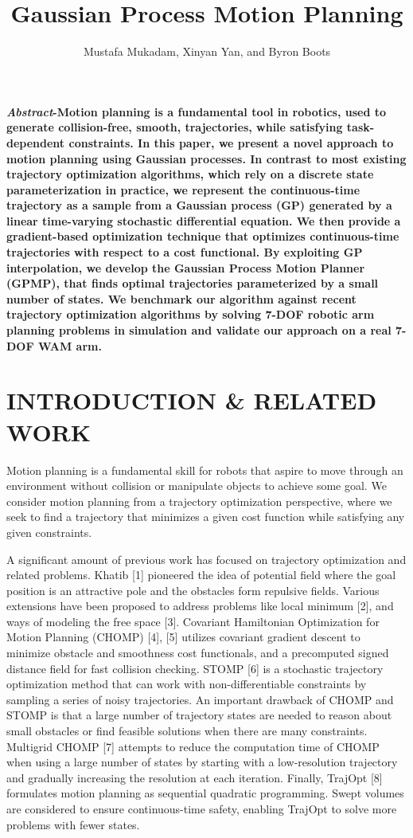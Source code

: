 \documentclass{IEEEtran}
\title{Gaussian Process Motion Planning}
\author{Mustafa Mukadam, Xinyan Yan, and Byron Boots}
\date{}
\begin{document}
\maketitle
\textbf{\emph{Abstract}-Motion planning is a fundamental tool in robotics,
used to generate collision-free, smooth, trajectories, while satisfying task-dependent constraints. In this paper, we present a
novel approach to motion planning using Gaussian processes.
In contrast to most existing trajectory optimization algorithms,
which rely on a discrete state parameterization in practice,
we represent the continuous-time trajectory as a sample from
a Gaussian process (GP) generated by a linear time-varying
stochastic differential equation. We then provide a gradient-based optimization technique that optimizes continuous-time
trajectories with respect to a cost functional. By exploiting GP
interpolation, we develop the Gaussian Process Motion Planner
(GPMP), that finds optimal trajectories parameterized by a
small number of states. We benchmark our algorithm against
recent trajectory optimization algorithms by solving 7-DOF
robotic arm planning problems in simulation and validate our
approach on a real 7-DOF WAM arm.}
\section{INTRODUCTION \& RELATED WORK}
Motion planning is a fundamental skill for robots that
aspire to move through an environment without collision
or manipulate objects to achieve some goal. We consider
motion planning from a trajectory optimization perspective,
where we seek to find a trajectory that minimizes a given
cost function while satisfying any given constraints.

A significant amount of previous work has focused on
trajectory optimization and related problems. Khatib [1]
pioneered the idea of potential field where the goal position is
an attractive pole and the obstacles form repulsive fields. Various extensions have been proposed to address problems like
local minimum [2], and ways of modeling the free space [3].
Covariant Hamiltonian Optimization for Motion Planning
(CHOMP) [4], [5] utilizes covariant gradient descent to minimize obstacle and smoothness cost functionals, and a precomputed signed distance field for fast collision checking.
STOMP [6] is a stochastic trajectory optimization method
that can work with non-differentiable constraints by sampling
a series of noisy trajectories. An important drawback of
CHOMP and STOMP is that a large number of trajectory
states are needed to reason about small obstacles or find
feasible solutions when there are many constraints. Multigrid
CHOMP [7] attempts to reduce the computation time of
CHOMP when using a large number of states by starting
with a low-resolution trajectory and gradually increasing the
resolution at each iteration. Finally, TrajOpt [8] formulates
motion planning as sequential quadratic programming. Swept volumes are considered to ensure continuous-time safety,
enabling TrajOpt to solve more problems with fewer states.
\end{document}
